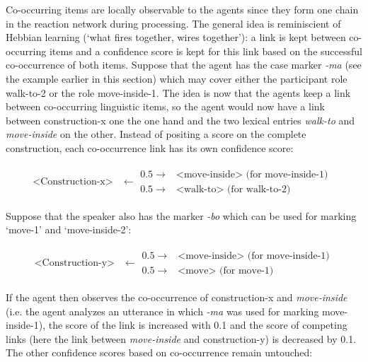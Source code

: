 Co-occurring items are locally observable to the agents since they form one chain in the reaction network during processing. The general idea is reminiscient of Hebbian learning (`what fires together, wires together'): a link is kept between co-occurring items and a confidence score is kept for this link based on the successful co-occurrence of both items. Suppose that the agent has the case marker {\em -ma} (see the example earlier in this section) which may cover either the participant role walk-to-2 or the role move-inside-1. The idea is now that the agents keep a link between co-occurring linguistic items, so the agent would now have a link between construction-x one the one hand and the two lexical entries {\em walk-to} and {\em move-inside} on the other. Instead of positing a score on the complete construction, each co-occurrence link has its own confidence score: 

\ea
\parbox{\textwidth}{
  \begin{align*}
  \text{<Construction-x>} & \leftarrow  
  \begin{array}{ll} 
  0.5 \rightarrow & \text{<move-inside> (for move-inside-1) }\\
  0.5 \rightarrow & \text{<walk-to> (for walk-to-2)}
  \end{array}
  \end{align*}
}
\z

Suppose that the speaker also has the marker {\em -bo} which can be used for marking `move-1' and `move-inside-2':

\ea
\parbox{\textwidth}{
  \begin{align*}
  \text{<Construction-y>} & \leftarrow  
  \begin{array}{ll} 
  0.5 \rightarrow & \text{<move-inside> (for move-inside-1)} \\
  0.5 \rightarrow & \text{<move> (for move-1)}
  \end{array}
  \end{align*}
  }
\z

If the agent then observes the co-occurrence of construction-x and {\em move-inside} (i.e. the agent analyzes an utterance in which {\em -ma} was used for marking move-inside-1), the score of the link is increased with 0.1 and the score of competing links (here the link between {\em move-inside} and construction-y) is decreased by 0.1. The other confidence scores based on co-occurrence remain untouched:

